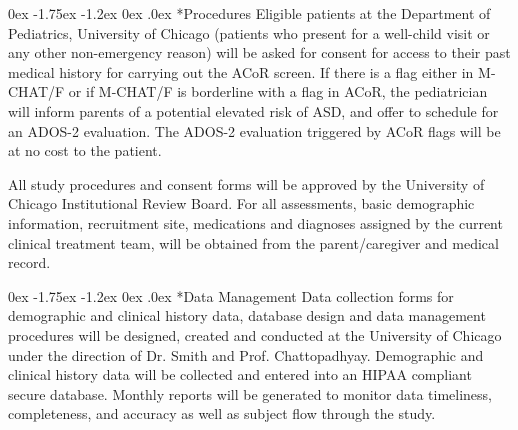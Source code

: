 \documentclass[onecolumn, compsoc,11pt]{IEEEtran}
\makeatletter
\renewcommand\subsection{\@startsection {subsection}{2}{\z@}%
                                   {0ex \@plus -1.75ex \@minus -1.2ex}%
                                   {0ex \@plus.0ex}%
                                   {\fontsize{11}{11}\selectfont\bfseries\sffamily\color{black}}}
\def\ZERO{ACoR\xspace}
\makeatother
\begin{document}
\subsection*{Procedures} Eligible patients at the Department of Pediatrics, University of Chicago (patients who present for a well-child visit or any other non-emergency reason) will be asked  for consent for access to their past medical history for carrying out the \ZERO screen. 
If there is a flag either in M-CHAT/F or if M-CHAT/F is borderline with a flag in \ZERO, the  pediatrician will inform parents of a potential elevated risk of ASD, and offer to schedule for an ADOS-2 evaluation. 
The ADOS-2 evaluation triggered by \ZERO flags will be at no cost to the patient.

 All study procedures and consent forms will be approved by the University of Chicago Institutional Review Board.  For all assessments, basic demographic information, recruitment site, medications and diagnoses assigned by the current clinical treatment team, will be obtained from the parent/caregiver and medical record.

\subsection*{Data Management} Data collection forms for demographic and clinical history data, database design and data management procedures will be designed, created and conducted at the University of Chicago under the
direction of Dr. Smith and Prof. Chattopadhyay. Demographic and clinical history data will be collected and entered into an HIPAA compliant secure database.  Monthly reports will be generated  to monitor data timeliness, completeness, and accuracy as well as subject flow through the study. 


\clearpage
\normalem 



\end{document}
